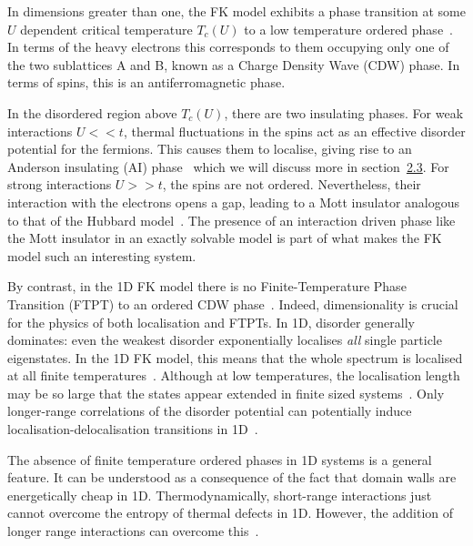 In dimensions greater than one, the FK model exhibits a phase transition at some \(U\) dependent critical temperature \(T_c(U)\) to a low temperature ordered phase~\autocite{maskaThermodynamicsTwodimensionalFalicovKimball2006}. In terms of the heavy electrons this corresponds to them occupying only one of the two sublattices A and B, known as a Charge Density Wave (CDW) phase. In terms of spins, this is an antiferromagnetic phase.

In the disordered region above \(T_c(U)\), there are two insulating phases. For weak interactions \(U << t\), thermal fluctuations in the spins act as an effective disorder potential for the fermions. This causes them to localise, giving rise to an Anderson insulating (AI) phase~\autocite{andersonAbsenceDiffusionCertain1958} which we will discuss more in section~\protect\hyperlink{bg-disorder-and-localisation}{2.3}. For strong interactions \(U >> t\), the spins are not ordered. Nevertheless, their interaction with the electrons opens a gap, leading to a Mott insulator analogous to that of the Hubbard model~\autocite{brandtThermodynamicsCorrelationFunctions1989}. The presence of an interaction driven phase like the Mott insulator in an exactly solvable model is part of what makes the FK model such an interesting system.

By contrast, in the 1D FK model there is no Finite-Temperature Phase Transition (FTPT) to an ordered CDW phase~\autocite{liebAbsenceMottTransition1968}. Indeed, dimensionality is crucial for the physics of both localisation and FTPTs. In 1D, disorder generally dominates: even the weakest disorder exponentially localises \emph{all} single particle eigenstates. In the 1D FK model, this means that the whole spectrum is localised at all finite temperatures~\autocite{goldshteinPurePointSpectrum1977,abrahamsScalingTheoryLocalization1979,kramerLocalizationTheoryExperiment1993}. Although at low temperatures, the localisation length may be so large that the states appear extended in finite sized systems~\autocite{antipovInteractionTunedAndersonMott2016}. Only longer-range correlations of the disorder potential can potentially induce localisation-delocalisation transitions in 1D~\autocite{aubryAnalyticityBreakingAnderson1980,dassarmaLocalizationMobilityEdges1990,dunlapAbsenceLocalizationRandomdimer1990}.

The absence of finite temperature ordered phases in 1D systems is a general feature. It can be understood as a consequence of the fact that domain walls are energetically cheap in 1D. Thermodynamically, short-range interactions just cannot overcome the entropy of thermal defects in 1D. However, the addition of longer range interactions can overcome this~\autocite{peierlsIsingModelFerromagnetism1936,kennedyItinerantElectronModel1986}.

